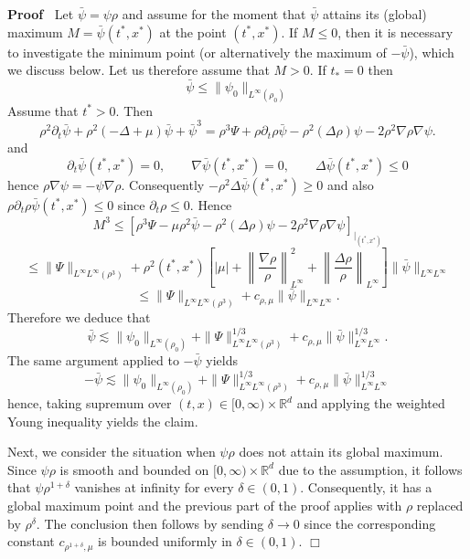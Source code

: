 \documentclass[a4paper,11pt]{article}
\renewcommand{\leq}{\leqslant}
\renewcommand{\geq}{\geqslant}
\newenvironment{proof}{\noindent\textbf{Proof\ }}{\hspace*{\fill}$\Box$\medskip}
\numberwithin{equation}{section}
\newcommand{\R}{\mathbb{R}}
\newcommand{\8}{\infty}
\begin{document}
\begin{proof}
Let $\bar\psi=\psi\rho$ and assume for the moment that $\bar\psi$ attains its (global) maximum $M=\bar\psi(t^{*},x^{*})$ at the point $(t^{*},x^{*})$. If $M\leq0$, then it is necessary to investigate the minimum point (or alternatively the maximum of $-\bar\psi$), which we discuss below. Let us therefore assume  that $M>0$. If $t_{*}=0$ then
$$
\bar\psi\leqslant \|\psi_{0}\|_{L^{\infty}(\rho_{0})}
$$
Assume that $t^{*}>0$.
Then
$$
\rho^{2}\partial_{t}\bar\psi+\rho^{2}(-\Delta+\mu)\bar\psi +\bar\psi^{3} = \rho^{3}\Psi +\rho\partial_{t}\rho\bar\psi - \rho^{2}(\Delta \rho) \psi - 2\rho^{2}\nabla\rho\nabla\psi.
$$
and
$$
\partial_{t}\bar\psi(t^{*},x^{*})= 0,\qquad\nabla\bar\psi(t^{*},x^{*})=0,\qquad\Delta\bar\psi(t^{*},x^{*})\leq0
$$
hence $\rho\nabla\psi=-\psi\nabla\rho$. Consequently $-\rho^{2}\Delta\bar\psi(t^{*},x^{*})\geq0$ and also $\rho\partial_{t}\rho\bar\psi(t^{*},x^{*})\leqslant 0$ since $\partial_{t}\rho
\leqslant 0$. Hence
$$
M^{3}\leqslant \left[\rho^{3}\Psi -\mu\rho^{2}\bar\psi - \rho^{2}(\Delta \rho) \psi - 2\rho^{2}\nabla\rho\nabla\psi\right]_{|_{(t^{*},x^{*})}}
$$
$$
\leqslant \|\Psi\|_{L^{\infty}L^{\infty}(\rho^{3})} +\rho^{2}(t^{*},x^{*})\left[|\mu|+\left\|\frac{\nabla\rho}{\rho}\right\|^{2}_{L^{\infty}}+\left\|\frac{\Delta\rho}{\rho}\right\|_{L^{\infty}}\right]\|\bar\psi\|_{L^{\infty}L^{\infty}}
$$
$$
\leqslant \|\Psi\|_{L^{\infty}L^{\infty}(\rho^{3})} +c_{\rho,\mu}\|\bar\psi\|_{L^{\infty}L^{\infty}}.
$$
Therefore we deduce that
$$
\bar\psi\lesssim \|\psi_{0}\|_{L^{\infty}(\rho_{0})}+\|\Psi\|^{1/3}_{L^{\infty}L^{\infty}(\rho^{3})} +c_{\rho,\mu}\|\bar\psi\|^{1/3}_{L^{\infty}L^{\infty}}.
$$
The same argument applied to $-\bar\psi$ yields
$$
-\bar\psi\lesssim \|\psi_{0}\|_{L^{\infty}(\rho_{0})}+\|\Psi\|^{1/3}_{L^{\infty}L^{\infty}(\rho^{3})} +c_{\rho,\mu}\|\bar\psi\|^{1/3}_{L^{\infty}L^{\infty}}
$$
hence, taking supremum over $(t,x)\in [0,\8)\times\R^{d}$ and applying the weighted Young inequality yields the claim.


Next, we consider the situation when $\psi\rho$ does not attain its global maximum. Since $\psi\rho$ is smooth and  bounded on $[0,\infty)\times\R^{d}$ due to the assumption, it follows that  $\psi\rho^{1+\delta}$ vanishes at infinity for every $\delta\in (0,1)$. Consequently, it has a global maximum point and the previous part of the proof applies with $\rho$ replaced by $\rho^{\delta}$. The conclusion then follows by sending $\delta\to 0$ since the corresponding constant $c_{\rho^{1+\delta},\mu}$ is bounded uniformly in $\delta\in (0,1).$
\end{proof}
\end{document}
